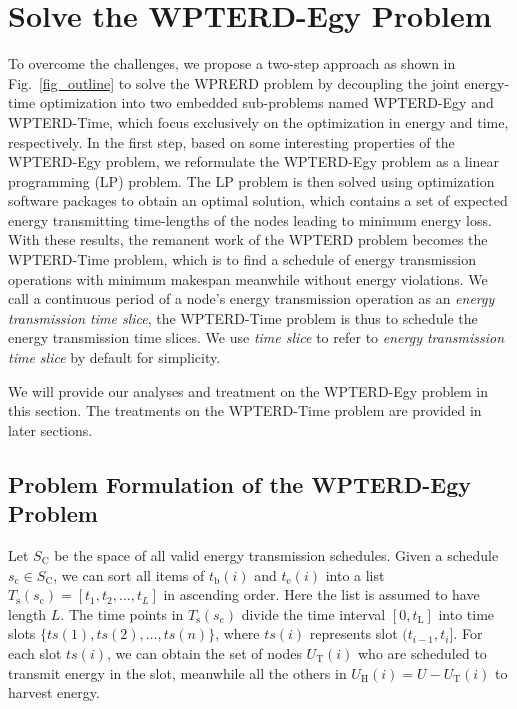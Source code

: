 \documentclass[journal,10pt]{IEEEtran}
\begin{document}
\section{Solve the WPTERD-Egy Problem}
\label{sec_wpter_egy}
To overcome the challenges, we propose a two-step approach as shown in Fig.~\ref{fig_outline} to solve the WPRERD problem by decoupling the joint energy-time optimization into two embedded sub-problems named WPTERD-Egy and WPTERD-Time, which focus exclusively on the optimization in energy and time, respectively. In the first step, based on some interesting properties of the WPTERD-Egy problem, we reformulate the WPTERD-Egy problem as a linear programming (LP) problem. The LP problem is then solved using optimization software packages to obtain an optimal solution, which contains a set of expected energy transmitting time-lengths of the nodes leading to minimum energy loss. With these results, the remanent work of the WPTERD problem becomes the WPTERD-Time problem, which is to find a schedule of energy transmission operations with minimum makespan meanwhile without energy violations. We call a continuous period of a node's energy transmission operation as an \textit{energy transmission time slice}, the WPTERD-Time problem is thus to schedule the energy transmission time slices. We use \textit{time slice} to refer to \textit{energy transmission time slice} by default for simplicity.

We will provide our analyses and treatment on the WPTERD-Egy problem in this section. The treatments on the WPTERD-Time problem are provided in later sections.

\subsection{Problem Formulation of the WPTERD-Egy Problem}

Let $S_\text{C}$ be the space of all valid energy transmission schedules. Given a schedule $s_\text{c}{\in}S_\text{C}$, we can sort all items of $t_\text{b}(i)$ and $t_\text{e}(i)$ into a list $T_\text{s}(s_\text{c}){=}[t_1,t_2,\ldots,t_{L}]$ in ascending order. Here the list is assumed to have length $L$. The time points in $T_\text{s}(s_\text{c})$ divide the time interval $[0,t_\text{L}]$ into time slots $\{ts(1),ts(2),\ldots,ts(n)\}$, where $ts(i)$ represents slot $(t_{i{-}1},t_i]$. For each slot $ts(i)$, we can obtain the set of nodes $U_\text{T}(i)$ who are scheduled to transmit energy in the slot, meanwhile all the others in $U_\text{H}(i){=}U{-}U_\text{T}(i)$ to harvest energy.
\end{document}
